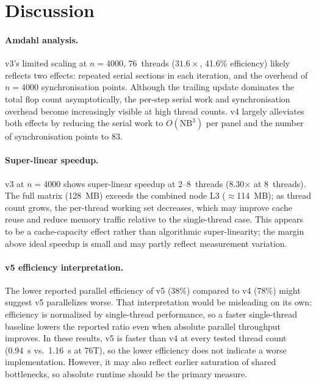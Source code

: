 \documentclass{article}
\begin{document}
\section{Discussion}

\paragraph{Amdahl analysis.}
v3's limited scaling at $n=4000$, 76~threads ($31.6\times$, 41.6\% efficiency)
likely reflects two effects: repeated serial sections in each iteration, and
the overhead of $n=4000$ synchronisation points.
Although the trailing update dominates the total flop count asymptotically,
the per-step serial work and synchronisation overhead become increasingly
visible at high thread counts.
v4 largely alleviates both effects by reducing the serial work to $O(\mathrm{NB}^3)$
per panel and the number of synchronisation points to 83.

\paragraph{Super-linear speedup.}
v3 at $n=4000$ shows super-linear speedup at 2--8~threads (8.30$\times$ at
8~threads).
The full matrix (128~MB) exceeds the combined node L3 ($\approx$114~MB); as thread count grows,
the per-thread working set decreases, which may improve cache reuse and reduce
memory traffic relative to the single-thread case.
This appears to be a cache-capacity effect rather than algorithmic
super-linearity; the margin above ideal speedup is small and may partly reflect
measurement variation.

\paragraph{v5 efficiency interpretation.}
The lower reported parallel efficiency of v5 (38\%) compared to v4 (78\%)
might suggest v5 parallelizes worse.
That interpretation would be misleading on its own: efficiency is normalized by
single-thread performance, so a faster single-thread baseline lowers the reported
ratio even when absolute parallel throughput improves.
In these results, v5 is faster than v4 at every tested thread count (0.94~s
vs.\ 1.16~s at 76T), so the lower efficiency does not indicate a worse
implementation.
However, it may also reflect earlier saturation of shared bottlenecks, so
absolute runtime should be the primary measure.
\end{document}
